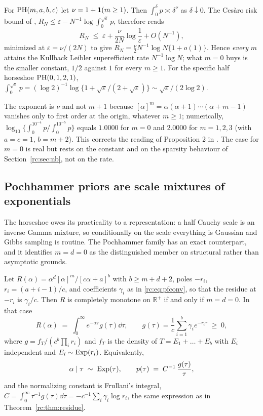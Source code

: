 \begin{corollary}\label{rc:cor:rate}
For $\mathrm{PH}(m,a,b,c)$ let $\nu=1+\mathbf{1}(m\ge1)$. Then $\int_0^\delta p\asymp\delta^{\nu}$ as $\delta\downarrow0$. The Ces\`aro risk bound of \citet{rc:polson2010}, $R_N\le\varepsilon-N^{-1}\log\int_0^{\sqrt\varepsilon}p$, therefore reads
\[
R_N\;\le\;\varepsilon+\frac{\nu}{2N}\log\frac1\varepsilon+O(N^{-1}),
\]
minimized at $\varepsilon=\nu/(2N)$ to give $R_N=\frac{\nu}{2}N^{-1}\log N\{1+o(1)\}$. Hence \emph{every} $m$ attains the Kullback Leibler superefficient rate $N^{-1}\log N$; what $m=0$ buys is the smaller constant, $1/2$ against $1$ for every $m\ge1$. For the specific half horseshoe $\mathrm{PH}(0,1,2,1)$, $\int_0^{\sqrt\varepsilon}p=(\log2)^{-1}\log\{1+\sqrt\varepsilon/(2+\sqrt\varepsilon)\}\sim\sqrt\varepsilon/(2\log2)$.
\end{corollary}

The exponent is $\nu$ and not $m+1$ because $[\alpha]^m=\alpha(\alpha+1)\cdots(\alpha+m-1)$ vanishes only to first order at the origin, whatever $m\ge1$; numerically, $\log_{10}\{\int_0^{10^{-4}}p/\int_0^{10^{-5}}p\}$ equals $1.0000$ for $m=0$ and $2.0000$ for $m=1,2,3$ (with $a=c=1$, $b=m+2$). This corrects the reading of Proposition 2 in \citet{rc:wang2024}. The case for $m=0$ is real but rests on the constant and on the sparsity behaviour of Section~\ref{rc:sec:nb}, not on the rate.

\subsection{Pochhammer priors are scale mixtures of exponentials}

The horseshoe owes its practicality to a representation: a half Cauchy scale is an inverse Gamma mixture, so conditionally on the scale everything is Gaussian and Gibbs sampling is routine. The Pochhammer family has an exact counterpart, and it identifies $m=d=0$ as the distinguished member on structural rather than asymptotic grounds.

\begin{theorem}\label{rc:thm:cm}
Let $R(\alpha)=\alpha^d[\alpha]^m/[c\alpha+a]^b$ with $b\ge m+d+2$, poles $-r_i$, $r_i=(a+i-1)/c$, and coefficients $\gamma_i$ as in \eqref{rc:eq:pfconv}, so that the residue at $-r_i$ is $\gamma_i/c$. Then $R$ is completely monotone on $\mathbb{R}^+$ if and only if $m=d=0$. In that case
\begin{equation}\label{rc:eq:cm}
R(\alpha)\;=\;\int_0^\infty e^{-\alpha\tau}g(\tau)\dd\tau,\qquad g(\tau)=\frac1c\sum_{i=1}^b\gamma_ie^{-r_i\tau}\;\ge\;0,
\end{equation}
where $g=f_T/(c^b\prod_ir_i)$ and $f_T$ is the density of $T=E_1+\dots+E_b$ with $E_i$ independent and $E_i\sim\mathrm{Exp}(r_i)$. Equivalently,
\begin{equation}\label{rc:eq:latent}
\alpha\mid\tau\;\sim\;\mathrm{Exp}(\tau),\qquad p(\tau)\;=\;C^{-1}\,\frac{g(\tau)}{\tau},
\end{equation}
and the normalizing constant is Frullani's integral, $C=\int_0^\infty\tau^{-1}g(\tau)\dd\tau=-c^{-1}\sum_i\gamma_i\log r_i$, the same expression as in Theorem~\ref{rc:thm:residue}.
\end{theorem}

